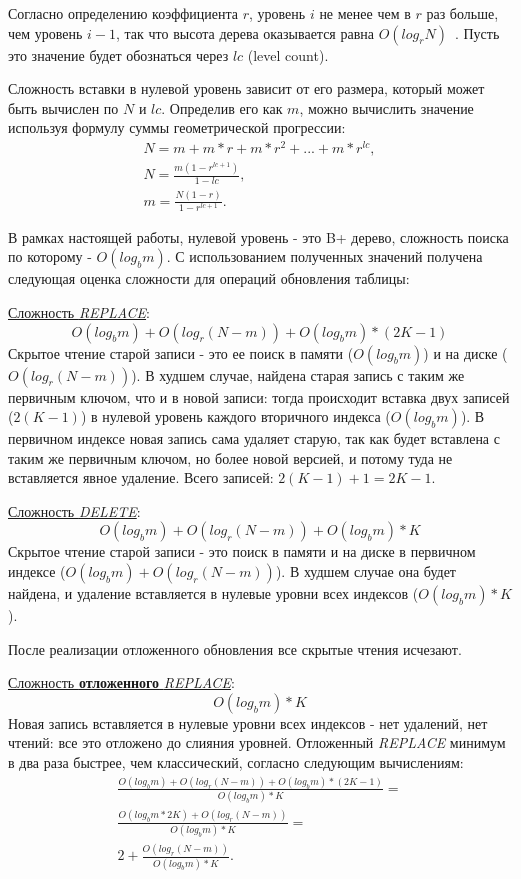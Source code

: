 \documentclass[a4paper,hidelinks,12pt]{article}
\begin{document}
Согласно определению коэффициента $r$, уровень $i$ не менее чем в $r$ раз
больше, чем уровень $i - 1$, так что высота дерева оказывается равна
$O(log_rN)$~\cite{slimdb}. Пусть это значение будет обознаться через $lc$
(level count).

Сложность вставки в нулевой уровень зависит от его размера, который может быть
вычислен по $N$ и $lc$. Определив его как $m$, можно вычислить значение
используя формулу суммы геометрической прогрессии:
\begin{gather*}
N = m + m*r + m*r^2 + ... + m*r^{lc}, \\
N = \frac{m(1 - r^{lc+1})}{1 - lc}, \\
m = \frac{N(1 - r)}{1 - r^{lc + 1}}.
\end{gather*}

В рамках настоящей работы, нулевой уровень - это B+ дерево, сложность поиска по
которому - $O(log_bm)$. С использованием полученных значений получена следующая
оценка сложности для операций обновления таблицы:

\underline{Сложность \textit{REPLACE}}:
\begin{displaymath}
O(log_bm) + O(log_r(N - m)) + O(log_bm) * (2K - 1)
\end{displaymath}
Скрытое чтение старой записи - это ее поиск в памяти ($O(log_bm)$) и на диске
($O(log_r(N - m))$). В худшем случае, найдена старая запись с таким же первичным
ключом, что и в новой записи: тогда происходит вставка двух записей ($2(K - 1)$)
в нулевой уровень каждого вторичного индекса ($O(log_bm)$). В первичном индексе
новая запись сама удаляет старую, так как будет вставлена с таким же первичным
ключом, но более новой версией, и потому туда не вставляется явное удаление.
Всего записей: $2(K - 1) + 1 = 2K - 1$.

\underline{Сложность \textit{DELETE}}:
\begin{displaymath}
O(log_bm) + O(log_r(N - m)) + O(log_bm) * K
\end{displaymath}
Скрытое чтение старой записи - это поиск в памяти и на диске в первичном
индексе ($O(log_bm) + O(log_r(N - m))$). В худшем случае она будет найдена, и
удаление вставляется в нулевые уровни всех индексов ($O(log_bm) * K$).

После реализации отложенного обновления все скрытые чтения исчезают.

\underline{Сложность \textbf {отложенного} \textit{REPLACE}}:
\begin{displaymath}
O(log_bm) * K
\end{displaymath}
Новая запись вставляется в нулевые уровни всех индексов - нет удалений, нет
чтений: все это отложено до слияния уровней. Отложенный \textit{REPLACE} минимум
в два раза быстрее, чем классический, согласно следующим вычислениям:
\begin{gather*}
\frac{O(log_bm) + O(log_r(N - m)) + O(log_bm) * (2K - 1)}{O(log_bm) * K} = \\
\frac{O(log_bm * 2K) + O(log_r(N - m))}{O(log_bm) * K} = \\
2 + \frac{O(log_r(N - m))}{O(log_bm) * K}.
\end{gather*}
\end{document}
